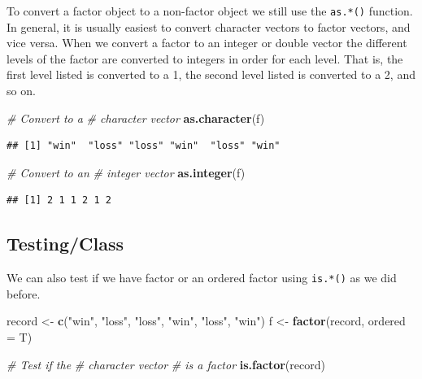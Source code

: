 \documentclass[
]{book}
\newenvironment{Shaded}{\begin{snugshade}}{\end{snugshade}}
\newcommand{\CommentTok}[1]{\textcolor[rgb]{0.56,0.35,0.01}{\textit{#1}}}
\newcommand{\DataTypeTok}[1]{\textcolor[rgb]{0.13,0.29,0.53}{#1}}
\newcommand{\KeywordTok}[1]{\textcolor[rgb]{0.13,0.29,0.53}{\textbf{#1}}}
\newcommand{\NormalTok}[1]{#1}
\newcommand{\StringTok}[1]{\textcolor[rgb]{0.31,0.60,0.02}{#1}}
\begin{document}
To convert a factor object to a non-factor object we still use the \texttt{as.*()} function. In general, it is usually easiest to convert character vectors to factor vectors, and vice versa. When we convert a factor to an integer or double vector the different levels of the factor are converted to integers in order for each level. That is, the first level listed is converted to a 1, the second level listed is converted to a 2, and so on.

\begin{Shaded}
\begin{Highlighting}[]
\CommentTok{# Convert to a}
\CommentTok{# character vector}
\KeywordTok{as.character}\NormalTok{(f)}
\end{Highlighting}
\end{Shaded}

\begin{verbatim}
## [1] "win"  "loss" "loss" "win"  "loss" "win"
\end{verbatim}

\begin{Shaded}
\begin{Highlighting}[]
\CommentTok{# Convert to an}
\CommentTok{# integer vector}
\KeywordTok{as.integer}\NormalTok{(f)}
\end{Highlighting}
\end{Shaded}

\begin{verbatim}
## [1] 2 1 1 2 1 2
\end{verbatim}

\hypertarget{testingclass}{%
\subsection{Testing/Class}\label{testingclass}}

We can also test if we have factor or an ordered factor using \texttt{is.*()} as we did before.

\begin{Shaded}
\begin{Highlighting}[]
\NormalTok{record <-}\StringTok{ }\KeywordTok{c}\NormalTok{(}\StringTok{"win"}\NormalTok{, }\StringTok{"loss"}\NormalTok{,}
    \StringTok{"loss"}\NormalTok{, }\StringTok{"win"}\NormalTok{, }\StringTok{"loss"}\NormalTok{,}
    \StringTok{"win"}\NormalTok{)}
\NormalTok{f <-}\StringTok{ }\KeywordTok{factor}\NormalTok{(record, }\DataTypeTok{ordered =}\NormalTok{ T)}


\CommentTok{# Test if the}
\CommentTok{# character vector}
\CommentTok{# is a factor}
\KeywordTok{is.factor}\NormalTok{(record)}
\end{Highlighting}
\end{Shaded}
\end{document}
